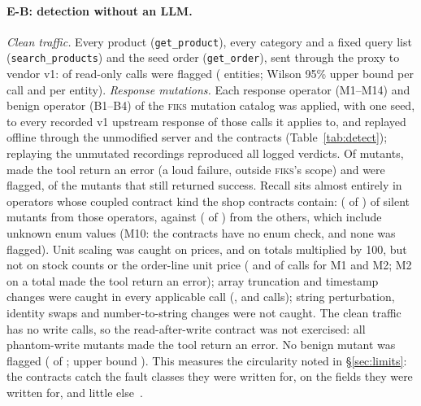 \documentclass[10pt]{article}
\newcommand{\fiks}{\textsc{fiks}}
\begin{document}
\paragraph{E-B: detection without an LLM.} \emph{Clean traffic.} Every product (\texttt{get\_product}), every category and a fixed query list (\texttt{search\_products}) and the seed order (\texttt{get\_order}), sent through the proxy to vendor v1: \expDetectCleanViolated{} of \expDetectCleanCalls{} read-only calls were flagged (\expDetectCleanEntities{} entities; Wilson 95\% upper bound \expDetectWilsonUpperCall{} per call and \expDetectWilsonUpperEntity{} per entity). \emph{Response mutations.} Each response operator (M1--M14) and benign operator (B1--B4) of the \fiks{} mutation catalog was applied, with one seed, to every recorded v1 upstream response of those calls it applies to, and replayed offline through the unmodified server and the contracts (Table~\ref{tab:detect}); replaying the unmutated recordings reproduced all \expDetectControlsMatch{} logged verdicts. Of \expDetectMutants{} mutants, \expDetectMutantsToolError{} made the tool return an error (a loud failure, outside \fiks's scope) and \expDetectMutantsFlagged{} were flagged, \expDetectRecallSilent{} of the \expDetectMutantsSilent{} mutants that still returned success. Recall sits almost entirely in operators whose coupled contract kind the shop contracts contain: \expDetectRecallCheckedSilent{} (\expDetectFlaggedChecked{} of \expDetectMutantsCheckedSilent) of silent mutants from those operators, against \expDetectRecallOutsideSilent{} (\expDetectFlaggedOutside{} of \expDetectMutantsOutsideSilent) from the others, which include unknown enum values (M10: the contracts have no enum check, and none was flagged). Unit scaling was caught on prices, and on totals multiplied by 100, but not on stock counts or the order-line unit price (\expDetectFlaggedMOne{} and \expDetectFlaggedMTwo{} of \expDetectApplicableMOne{} calls for M1 and M2; M2 on a total made the tool return an error); array truncation and timestamp changes were caught in every applicable call (\expDetectApplicableMSix, \expDetectApplicableMEight{} and \expDetectApplicableMThirteen{} calls); string perturbation, identity swaps and number-to-string changes were not caught. The clean traffic has no write calls, so the read-after-write contract was not exercised: all \expDetectApplicableMFourteen{} phantom-write mutants made the tool return an error. No benign mutant was flagged (\expDetectBenignFlagged{} of \expDetectBenignApplicable; upper bound \expDetectBenignWilsonUpper). This measures the circularity noted in \S\ref{sec:limits}: the contracts catch the fault classes they were written for, on the fields they were written for, and little else~\cite{jahangirova2016oracle}.
\end{document}
